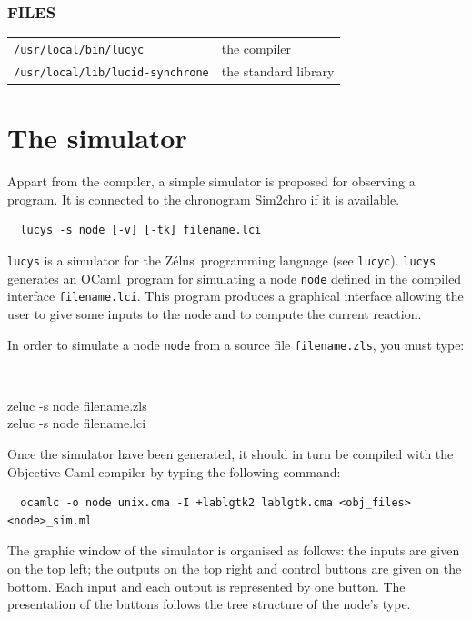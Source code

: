 \documentclass[11pt,titlepage,twoside]{report}
\newcommand{\zelus}{{\sf Z\'elus}}
\newcommand{\ocaml}{{\sf OCaml}}
\begin{document}
\subsection*{FILES}

\begin{tabular}{ll}
{\tt /usr/local/bin/lucyc}           & the compiler
\\
{\tt /usr/local/lib/lucid-synchrone} & the standard library
\end{tabular}

\chapter{The simulator}
Appart from the compiler, a simple simulator is proposed
for observing a program. It is connected to the chronogram Sim2chro if
it is available.

\begin{verbatim}
  lucys -s node [-v] [-tk] filename.lci
\end{verbatim}


\verb-lucys- is a simulator for the \zelus\ programming language (see
\verb-lucyc-). \verb-lucys- generates an \ocaml\ program for
simulating a node \verb-node- defined in the compiled interface
\verb-filename.lci-. This program produces a graphical interface
allowing the user to give some inputs to the node and to compute the
current reaction.


In order to simulate a node \verb-node- from a source file
\verb-filename.zls-, you must type:

{\tt
\begin{tabbing}
  zeluc -s node filename.zls \\
  zeluc -s node filename.lci
\end{tabbing}
}

Once the simulator have been generated, it should in turn be compiled
with the Objective Caml compiler by typing the following command:

\begin{verbatim}
  ocamlc -o node unix.cma -I +lablgtk2 lablgtk.cma <obj_files> <node>_sim.ml
\end{verbatim}


The graphic window of the simulator is organised as follows: the
inputs are given on the top left; the outputs on the top right and
control buttons are given on the bottom.
Each input and each output is represented
by one button. The presentation of the buttons follows the tree
structure of the node's type.
\end{document}

